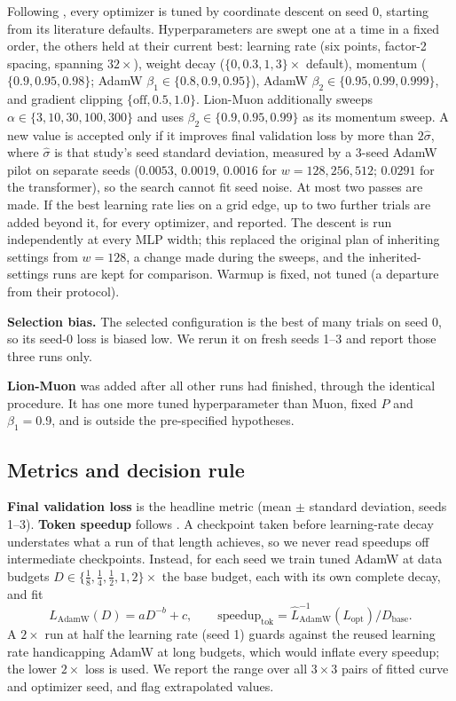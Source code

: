 Following \citet{wen2025fantastic}, every optimizer is tuned by coordinate descent on seed 0,
starting from its literature defaults. Hyperparameters are swept one at a time in a fixed
order, the others held at their current best: learning rate (six points, factor-2 spacing,
spanning $32\times$), weight decay ($\{0, 0.3, 1, 3\}\times$ default), momentum
($\{0.9, 0.95, 0.98\}$; AdamW $\beta_1\in\{0.8,0.9,0.95\}$), AdamW
$\beta_2\in\{0.95,0.99,0.999\}$, and gradient clipping $\{\text{off}, 0.5, 1.0\}$. Lion-Muon
additionally sweeps $\alpha\in\{3,10,30,100,300\}$ and uses $\beta_2\in\{0.9,0.95,0.99\}$ as its
momentum sweep. A new value is accepted only if it improves final validation loss by more than
$2\hat\sigma$, where $\hat\sigma$ is that study's seed standard deviation, measured by a
3-seed AdamW pilot on separate seeds ($0.0053$, $0.0019$, $0.0016$ for $w=128,256,512$; $0.0291$
for the transformer), so the search cannot fit seed noise. At most two passes are made. If the best learning rate lies on a grid edge, up to two further
trials are added beyond it, for every optimizer, and reported. The descent is run independently
at every MLP width; this replaced the original plan of inheriting settings from $w=128$, a
change made during the sweeps, and the inherited-settings runs are kept for comparison. Warmup is fixed, not tuned (a departure from their protocol).

\textbf{Selection bias.} The selected configuration is the best of many trials on seed 0, so its
seed-0 loss is biased low. We rerun it on fresh seeds 1--3 and report those three runs only.

\textbf{Lion-Muon} was added after all other runs had finished, through the identical procedure.
It has one more tuned hyperparameter than Muon, fixed $P$ and $\beta_1=0.9$, and is outside the pre-specified hypotheses.

\subsection{Metrics and decision rule}

\textbf{Final validation loss} is the headline metric (mean $\pm$ standard deviation, seeds
1--3). \textbf{Token speedup} follows \citet{wen2025fantastic}. A checkpoint taken before
learning-rate decay understates what a run of that length achieves, so we never read speedups
off intermediate checkpoints. Instead, for each seed we train tuned
AdamW at data budgets $D\in\{\tfrac18,\tfrac14,\tfrac12,1,2\}\times$ the base budget, each with
its own complete decay, and fit
\begin{equation}
\hat L_{\text{AdamW}}(D)=aD^{-b}+c,\qquad
\text{speedup}_{\text{tok}}=\hat L_{\text{AdamW}}^{-1}\!\left(L_{\text{opt}}\right)/D_{\text{base}} .
\end{equation}
A $2\times$ run at half the learning rate (seed 1) guards against the reused learning rate
handicapping AdamW at long budgets, which would inflate every speedup; the lower $2\times$ loss
is used. We report the range over all $3\times3$ pairs of fitted curve and optimizer seed, and flag extrapolated values.

